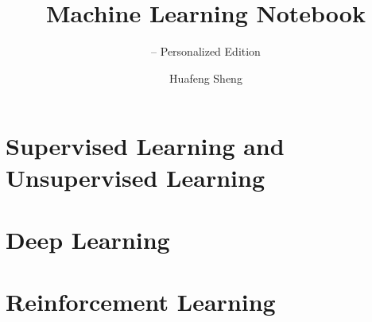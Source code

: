\documentclass[norunningheads, graybox, envcountchap]{styles02/svmono}
\begin{document}
	
	\author{Huafeng Sheng}
	\title{Machine Learning Notebook}
	\subtitle{-- Personalized Edition}
	\maketitle
	
	\frontmatter%
	
%	
	
	
	\tableofcontents
	
	
	
	\mainmatter%
	\part{Supervised Learning and Unsupervised Learning}
	
	
	
	
	
	
	
	
	
	
	
	
	
	
	
	
	
	
	
	
	
	
	
	
	
	
	
	\part{Deep Learning}
	
	
	
	\part{Reinforcement  Learning}
	
	\backmatter%
	\appendix
	
	\printindex
	
	
\end{document}
